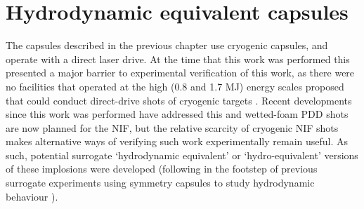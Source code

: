 



\section{Hydrodynamic equivalent capsules} \label{sec:Hydroequivalent}
The capsules described in the previous chapter use cryogenic capsules, and operate with a direct laser drive. At the time that this work was performed this presented a major barrier to experimental verification of this work, as there were no facilities that operated at the high (0.8 and 1.7 MJ) energy scales proposed that could conduct direct-drive shots of cryogenic targets \cite{Hohenberger2015}. Recent developments since this work was performed have addressed this and wetted-foam PDD shots are now planned for the NIF, but the relative scarcity of cryogenic NIF shots makes alternative ways of verifying such work experimentally remain useful. As such, potential surrogate `hydrodynamic equivalent' or `hydro-equivalent' versions of these implosions were developed (following in the footstep of previous surrogate experiments using symmetry capsules to study hydrodynamic behaviour \cite{Weber2016}). 

